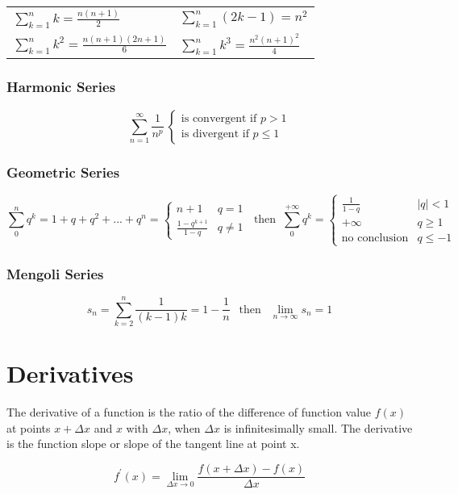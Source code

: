 \begin{tabular}{ l l }
$ \displaystyle \sum_{k=1}^n k = \frac{n(n+1)}{2} $ &
$ \displaystyle \sum_{k=1}^n (2k-1) = n^2 $ \\ [1.5em]
$ \displaystyle \sum_{k=1}^n k^2 = \frac{n(n+1)(2n+1)}{6} $ & 
$ \displaystyle \sum_{k=1}^n k^3 = \frac{n^2(n+1)^2}{4} $
\end{tabular}

\subsubsection{Harmonic Series}
\[
\sum_{n=1}^\infty \frac{1}{n^p} ~ \begin{cases}
									\text{is convergent if } p>1 \\
									\text{is divergent if } p\leq1
									\end{cases}
\]

\subsubsection{Geometric Series}
\[
\sum_{0}^{n}q^k=1+q+q^2+...+q^n= \begin{cases}
									n+1 & q=1 \\
									\frac{1-q^{k+1}}{1-q} & q\ne1
								 \end{cases}
~ \text{ then } ~
\sum_{0}^{+\infty}q^k= \begin{cases}
\frac{1}{1-q} & \left|q\right|<1 \\
+\infty & q\ge1 \\
\text{no conclusion} & q\le-1
\end{cases}
\]

\subsubsection{Mengoli Series}
\[
s_n=\sum_{k=2}^{n}\frac{1}{(k-1)k}=1-\frac{1}{n} ~~ \text{ then } ~~  \lim_{n\rightarrow\infty}s_n=1
\]

\section{Derivatives}
The derivative of a function is the ratio of the difference of function value $ f(x) $ at points $ x+\Delta x $ and $ x $ with $ \Delta x $, when $ \Delta x $ is infinitesimally small. The derivative is the function slope or slope of the tangent line at point x.

\[
f^\prime(x) = \lim_{\Delta x \rightarrow 0} \frac{ f( x + \Delta x ) - f(x) }{\Delta x}
\]

